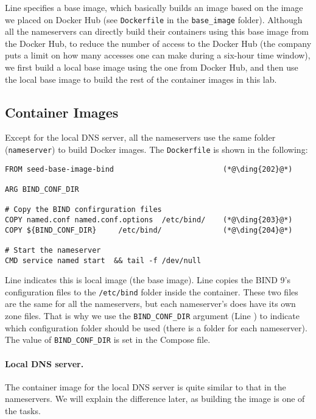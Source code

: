 Line  specifies a base image, which basically builds an 
image based on the  image 
we placed on Docker Hub (see \texttt{Dockerfile} in the \texttt{base\_image} folder). 
Although all the nameservers can directly build their containers using
this base image from the Docker Hub, to reduce
the number of access to the Docker Hub (the company
puts a limit on how many accesses one can make
during a six-hour time window), we first build a
local base image using the one from Docker Hub, and then
use the local base image to build the rest of the
container images in this lab.


\subsection{Container Images} 

Except for the local DNS server, all the nameservers use the same 
folder (\texttt{nameserver}) to build Docker images. The 
\texttt{Dockerfile} is shown in the following:  

\begin{lstlisting}
FROM seed-base-image-bind                         (*@\ding{202}@*)

ARG BIND_CONF_DIR

# Copy the BIND confirguration files
COPY named.conf named.conf.options  /etc/bind/    (*@\ding{203}@*)
COPY ${BIND_CONF_DIR}     /etc/bind/              (*@\ding{204}@*)

# Start the nameserver
CMD service named start  && tail -f /dev/null
\end{lstlisting}

Line  indicates this is local image (the base image).
Line  copies the BIND 9's configuration files to
the \texttt{/etc/bind} folder inside the container. These two files
are the same for all the nameservers, but each nameserver's 
does have its own zone files. That is why we use 
the \texttt{BIND\_CONF\_DIR} argument (Line ) to 
indicate which configuration folder should be used (there is 
a folder for each nameserver). The value of \texttt{BIND\_CONF\_DIR} 
is set in the Compose file. 


\paragraph{Local DNS server.}
The container image for the local DNS server is quite similar to
that in the nameservers. We will explain the difference later, 
as building the image is one of the tasks. 




